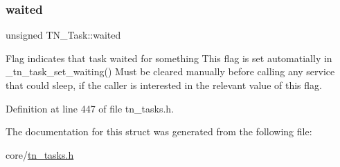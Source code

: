 \subsubsection{\texorpdfstring{waited}{waited}}
{\footnotesize\ttfamily unsigned T\+N\+\_\+\+Task\+::waited}



Flag indicates that task waited for something This flag is set automatially in {\ttfamily \+\_\+tn\+\_\+task\+\_\+set\+\_\+waiting()} Must be cleared manually before calling any service that could sleep, if the caller is interested in the relevant value of this flag. 



Definition at line 447 of file tn\+\_\+tasks.\+h.



The documentation for this struct was generated from the following file\+:\begin{DoxyCompactItemize}
\item 
core/\hyperlink{tn__tasks_8h}{tn\+\_\+tasks.\+h}\end{DoxyCompactItemize}
